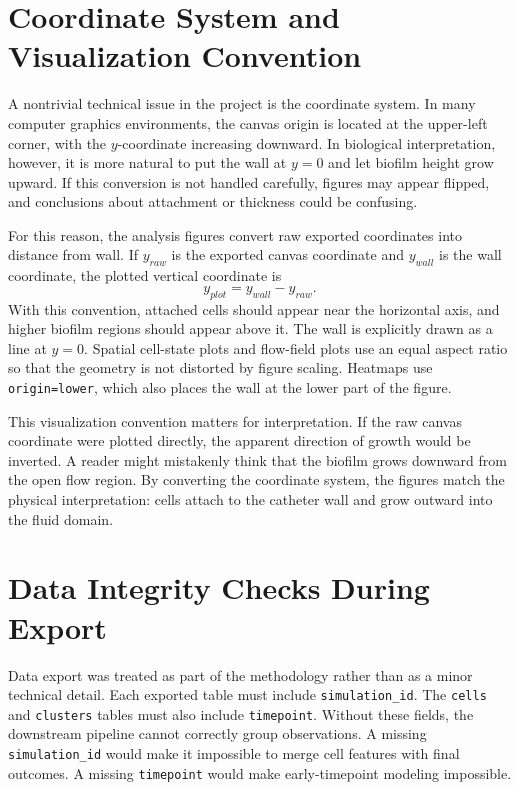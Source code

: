 \documentclass[12pt,a4paper,oneside]{report}
\begin{document}
\section{Coordinate System and Visualization Convention}
A nontrivial technical issue in the project is the coordinate system. In many computer graphics environments, the canvas origin is located at the upper-left corner, with the \(y\)-coordinate increasing downward. In biological interpretation, however, it is more natural to put the wall at \(y=0\) and let biofilm height grow upward. If this conversion is not handled carefully, figures may appear flipped, and conclusions about attachment or thickness could be confusing.

For this reason, the analysis figures convert raw exported coordinates into distance from wall. If \(y_{raw}\) is the exported canvas coordinate and \(y_{wall}\) is the wall coordinate, the plotted vertical coordinate is
\begin{equation}
y_{plot}=y_{wall}-y_{raw}.
\end{equation}
With this convention, attached cells should appear near the horizontal axis, and higher biofilm regions should appear above it. The wall is explicitly drawn as a line at \(y=0\). Spatial cell-state plots and flow-field plots use an equal aspect ratio so that the geometry is not distorted by figure scaling. Heatmaps use \texttt{origin=lower}, which also places the wall at the lower part of the figure.

This visualization convention matters for interpretation. If the raw canvas coordinate were plotted directly, the apparent direction of growth would be inverted. A reader might mistakenly think that the biofilm grows downward from the open flow region. By converting the coordinate system, the figures match the physical interpretation: cells attach to the catheter wall and grow outward into the fluid domain.

\section{Data Integrity Checks During Export}
Data export was treated as part of the methodology rather than as a minor technical detail. Each exported table must include \texttt{simulation\_id}. The \texttt{cells} and \texttt{clusters} tables must also include \texttt{timepoint}. Without these fields, the downstream pipeline cannot correctly group observations. A missing \texttt{simulation\_id} would make it impossible to merge cell features with final outcomes. A missing \texttt{timepoint} would make early-timepoint modeling impossible.
\end{document}

